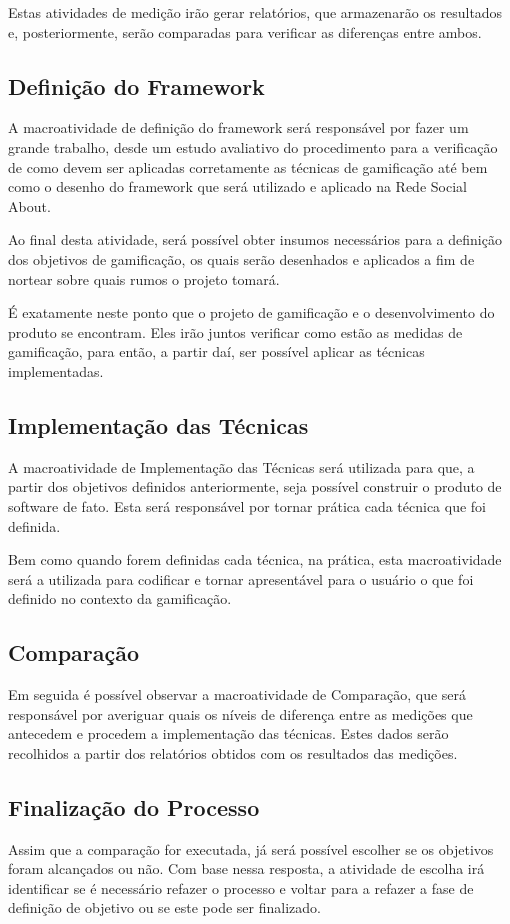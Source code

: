 Estas atividades de medição irão gerar relatórios, que armazenarão os resultados
e, posteriormente, serão comparadas para verificar as diferenças entre ambos.

\subsection{Definição do Framework}
\label{sub:definicaoframework}
A macroatividade de definição do framework será responsável por fazer um grande
trabalho, desde um estudo avaliativo do procedimento para a verificação de como
devem ser aplicadas corretamente as técnicas de gamificação até bem como o desenho
do framework que será utilizado e aplicado na Rede Social About.

Ao final desta atividade, será possível obter insumos necessários para a definição
dos objetivos de gamificação, os quais serão desenhados e aplicados a fim
de nortear sobre quais rumos o projeto tomará.

É exatamente neste ponto que o projeto de gamificação e o desenvolvimento do produto
se encontram. Eles irão juntos verificar como estão as medidas de gamificação, para
então, a partir daí, ser possível aplicar as técnicas implementadas.

\subsection{Implementação das Técnicas}
\label{sub:implematationtechnics}
A macroatividade de Implementação das Técnicas será utilizada para que, a partir
dos objetivos definidos anteriormente, seja possível construir o produto de software
de fato. Esta será responsável por tornar prática
cada técnica que foi definida.

Bem como quando forem definidas cada técnica, na prática, esta macroatividade
será a utilizada para codificar e tornar apresentável para o usuário o que
foi definido no contexto da gamificação.

\subsection{Comparação}
\label{sub:Comparacao}
Em seguida é possível observar a macroatividade de Comparação, que será
responsável por averiguar quais os níveis de diferença entre as medições que
antecedem e procedem a implementação das técnicas. Estes dados serão recolhidos a
partir dos relatórios obtidos com os resultados das medições.

\subsection{Finalização do Processo}
\label{sub:finalprocess}
Assim que a comparação for executada, já será possível escolher se os objetivos
foram alcançados ou não. Com base nessa resposta, a atividade de escolha irá
identificar se é necessário refazer o processo e voltar para a refazer a fase
de definição de objetivo ou se este pode ser finalizado.

